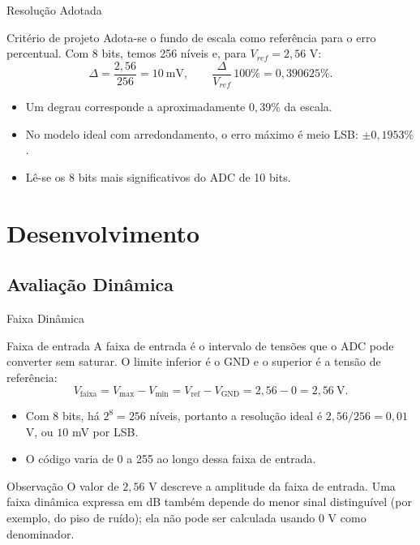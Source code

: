 \documentclass{beamer}
\begin{document}
\begin{frame}{Resolução Adotada}
\begin{block}{Critério de projeto}
Adota-se o fundo de escala como referência para o erro percentual.
Com 8 bits, temos 256 níveis e, para $V_{ref}=2{,}56$ V:
\[
\Delta=\frac{2{,}56}{256}=10\ \text{mV},\qquad
\frac{\Delta}{V_{ref}}\,100\%=0{,}390625\%.
\]
\end{block}
\begin{itemize}
\item Um degrau corresponde a aproximadamente $0{,}39\%$ da escala.
\item No modelo ideal com arredondamento, o erro máximo é meio LSB: $\pm 0{,}1953\%$.
\item Lê-se os 8 bits mais significativos do ADC de 10 bits.
\end{itemize}
\end{frame}

\section{Desenvolvimento}

\subsection{Avaliação Dinâmica}

\begin{frame}{Faixa Dinâmica}
\begin{block}{Faixa de entrada}
A faixa de entrada é o intervalo de tensões que o ADC pode converter sem saturar. O limite inferior é o GND e o superior é a tensão de referência:
\[
V_{\text{faixa}} = V_{\max} - V_{\min}
                = V_{\text{ref}} - V_{\text{GND}}
                = 2{,}56 - 0
                = 2{,}56\ \text{V}.
\]
\end{block}
\begin{itemize}
\item Com 8 bits, há $2^8=256$ níveis, portanto a resolução ideal é $2{,}56/256=0{,}01$ V, ou $10$ mV por LSB.
\item O código varia de 0 a 255 ao longo dessa faixa de entrada.
\end{itemize}
\begin{alertblock}{Observação}
O valor de $2{,}56$ V descreve a amplitude da faixa de entrada. Uma faixa dinâmica expressa em dB também depende do menor sinal distinguível (por exemplo, do piso de ruído); ela não pode ser calculada usando $0$ V como denominador.
\end{alertblock}
    
\end{frame}
\end{document}
